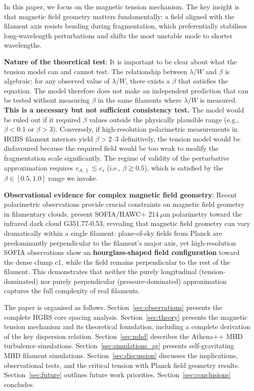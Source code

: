 \documentclass[11pt,a4paper]{article}
\begin{document}
In this paper, we focus on the magnetic tension mechanism. The key insight is that magnetic field geometry matters fundamentally: a field aligned with the filament axis resists bending during fragmentation, which preferentially stabilises long-wavelength perturbations and shifts the most unstable mode to shorter wavelengths.

\textbf{Nature of the theoretical test}: It is important to be clear about what the tension model can and cannot test. The relationship between $\lambda/W$ and $\beta$ is algebraic: for any observed value of $\lambda/W$, there exists a $\beta$ that satisfies the equation. The model therefore does not make an independent prediction that can be tested without measuring $\beta$ in the same filaments where $\lambda/W$ is measured. \textbf{This is a necessary but not sufficient consistency test.} The model would be ruled out if it required $\beta$ values outside the physically plausible range (e.g., $\beta < 0.1$ or $\beta > 3$). Conversely, if high-resolution polarimetric measurements in HGBS filament interiors yield $\beta > 2$--$3$ definitively, the tension model would be disfavoured because the required field would be too weak to modify the fragmentation scale significantly. The regime of validity of the perturbative approximation requires $v_{A,\parallel} \lesssim c_s$ (i.e., $\beta \gtrsim 0.5$), which is satisfied by the $\beta \in [0.5, 1.0]$ range we invoke.

\textbf{Observational evidence for complex magnetic field geometry}: Recent polarimetric observations provide crucial constraints on magnetic field geometry in filamentary clouds. \citet{Jadhav2026} present SOFIA/HAWC+ $214~\mu$m polarimetry toward the infrared dark cloud G351.77-0.53, revealing that magnetic field geometry can vary dramatically within a single filament: plane-of-sky fields from Planck are predominantly perpendicular to the filament's major axis, yet high-resolution SOFIA observations show an \textbf{hourglass-shaped field configuration} toward the dense clump c1, while the field remains perpendicular to the rest of the filament. This demonstrates that neither the purely longitudinal (tension-dominated) nor purely perpendicular (pressure-dominated) approximation captures the full complexity of real filaments.

The paper is organised as follows. Section~\ref{sec:observations} presents the complete HGBS core spacing analysis. Section~\ref{sec:theory} presents the magnetic tension mechanism and its theoretical foundation, including a complete derivation of the key dispersion relation. Section~\ref{sec:mhd} describes the Athena++ MHD turbulence simulations. Section~\ref{sec:simulations_sg} presents self-gravitating MHD filament simulations. Section~\ref{sec:discussion} discusses the implications, observational tests, and the critical tension with Planck field geometry results. Section~\ref{sec:future} outlines future work priorities. Section~\ref{sec:conclusions} concludes.
\end{document}
